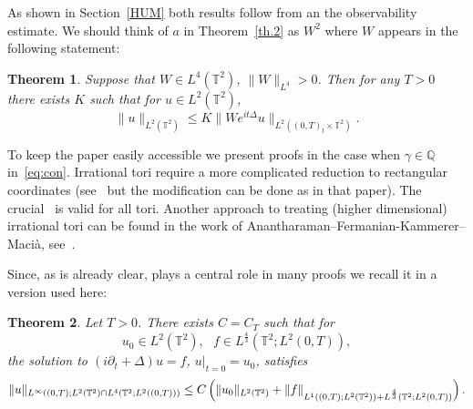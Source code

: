 \documentclass[11pt]{article}
\newtheorem{theo}{Theorem}[section]
\theoremstyle{definition}
\numberwithin{equation}{section}
\numberwithin{figure}{section}
\numberwithin{table}{section}
\newcommand{\TT}{{\mathbb T}}
\begin{document}
As shown in Section~\ref{HUM} both results follow from an the observability estimate. We should think of $ a $ in Theorem~\ref{th.2} as $ W^2 $ where $ W $ appears in the following statement:

\begin{theo}\label{th.1}
Suppose that $ W \in L^4 (\TT^2) $, $ \| W \|_{L^4} >0 $. Then for any $ T > 0$ there exists $ K $ such that for $ u \in L^2 (\TT^2) $,
\begin{equation}\label{eq:th1}
\| u \|_{ L^2 (\TT^2) } \leq K \| W e^{ it \Delta} u \|_{ L^2 ((0,T)_t \times \TT^2) }.
\end{equation}
\end{theo}

To keep the paper easily accessible we present proofs in the case when $ \gamma \in \mathbb Q $ in~\eqref{eq:con}. Irrational tori require a more complicated reduction to rectangular coordinates (see~\cite[Lemma~2.7 and Figure~1]{BZ4} but the modification can be done as in that paper). The crucial~\cite[Proposition~2.2]{BBZ} is valid for all tori. Another approach to treating (higher dimensional) irrational tori can be found in the work of Anantharaman--Fermanian-Kammerer--Macià, see~\cite[Corollary~1.19, Theorem~1.20]{AFM}.

Since, as is already clear, \cite[Proposition~2.2]{BBZ} plays a central role in many proofs we recall it in a version used here:

\begin{theo}\label{th.BBZ}
Let $ T > 0 $. There exists $ C = C_T $ such that for
\[
u_0\in L^2(\TT^2), \ \ \ f \in L^{\frac 4 3 } (\TT^2 ; L^2(0, T)),
\]
the solution to $ (i \partial_t + \Delta) u =f$, $ u|_{t=0} = u_0$, satisfies
\[
\| u\|_{L^\infty ((0, T) ; L^2 (\TT^2) \cap L^4(\TT^2; L^2((0,T)))}\\
\leq C \left(\|u_0\|_{L^2(\TT^2)} + \|f\|_{ L^1 ((0,T) ; L^2 (\TT^2)) + L^{\frac 4 3 } (\TT^2 ; L^2(0, T))}\right).
\]
\end{theo}
\end{document}
